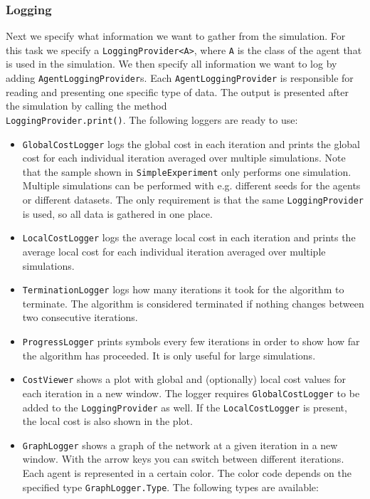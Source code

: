 \documentclass[11pt]{article} %
\newcommand{\code}{\texttt}
\begin{document}
\subsubsection*{Logging}
Next we specify what information we want to gather from the simulation. For this task we specify a \code{LoggingProvider<A>}, where \code{A} is the class of the agent that is used in the simulation.
We then specify all information we want to log by adding \code{AgentLoggingProvider}s. Each \code{AgentLoggingProvider} is responsible for reading and presenting one specific type of data. The output is presented after the simulation by calling the method \\\code{LoggingProvider.print()}. The following loggers are ready to use:
\begin{itemize}
	\item \code{GlobalCostLogger} logs the global cost in each iteration and prints the global cost for each individual iteration averaged over multiple simulations. Note that the sample shown in \code{SimpleExperiment} only performs one simulation. Multiple simulations can be performed with e.g. different seeds for the agents or different datasets. The only requirement is that the same \code{LoggingProvider} is used, so all data is gathered in one place.
	\item \code{LocalCostLogger} logs the average local cost in each iteration and prints the average local cost for each individual iteration averaged over multiple simulations.
	\item \code{TerminationLogger} logs how many iterations it took for the algorithm to terminate. The algorithm is considered terminated if nothing changes between two consecutive iterations.
	\item \code{ProgressLogger} prints symbols every few iterations in order to show how far the algorithm has proceeded. It is only useful for large simulations.
	\item \code{CostViewer} shows a plot with global and (optionally) local cost values for each iteration in a new window. The logger requires \code{GlobalCostLogger} to be added to the \code{LoggingProvider} as well. If the \code{LocalCostLogger} is present, the local cost is also shown in the plot.
	\item \code{GraphLogger} shows a graph of the network at a given iteration in a new window. With the arrow keys you can switch between different iterations. Each agent is represented in a certain color. The color code depends on the specified type \code{GraphLogger.Type}. The following types are available:

\end{itemize}
\end{document}
